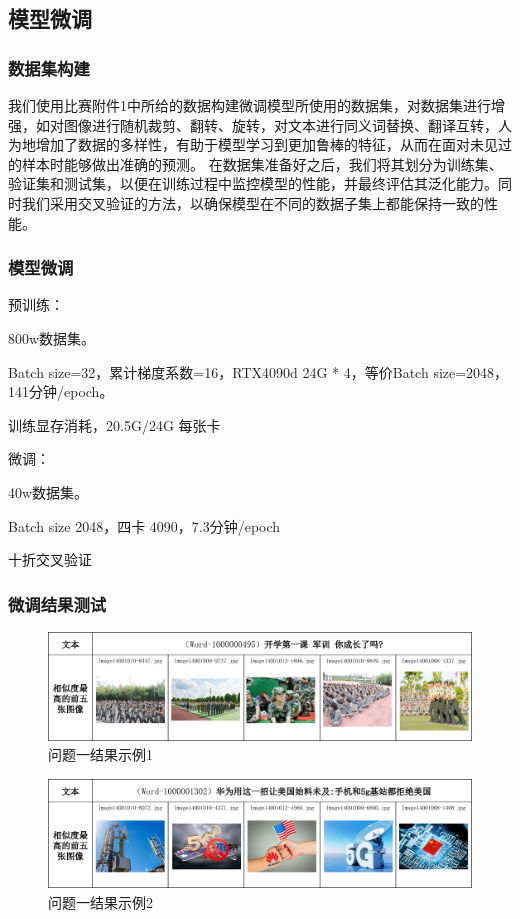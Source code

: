 \documentclass[a4paper]{zreport}
\begin{document}
\subsection{模型微调}

\subsubsection{数据集构建}
我们使用比赛附件1中所给的数据构建微调模型所使用的数据集，对数据集进行增强，如对图像进行随机裁剪、翻转、旋转，对文本进行同义词替换、翻译互转，人为地增加了数据的多样性，有助于模型学习到更加鲁棒的特征，从而在面对未见过的样本时能够做出准确的预测。
在数据集准备好之后，我们将其划分为训练集、验证集和测试集，以便在训练过程中监控模型的性能，并最终评估其泛化能力。同时我们采用交叉验证的方法，以确保模型在不同的数据子集上都能保持一致的性能。
\subsubsection{模型微调}

预训练：

800w数据集。

Batch size=32，累计梯度系数=16，RTX4090d 24G * 4，等价Batch size=2048，141分钟/epoch。

训练显存消耗，20.5G/24G 每张卡


微调：

40w数据集。

Batch size 2048，四卡 4090，7.3分钟/epoch

十折交叉验证

\subsubsection{微调结果测试}

\begin{figure}[h]
\centering
\includegraphics[width=1.\linewidth]{figures/example11}
\caption{问题一结果示例1}
\label{fig:example11}
\end{figure}

\begin{figure}[h]
\centering
\includegraphics[width=1.\linewidth]{figures/example12}
\caption{问题一结果示例2}
\label{fig:example12}
\end{figure}
\end{document}
